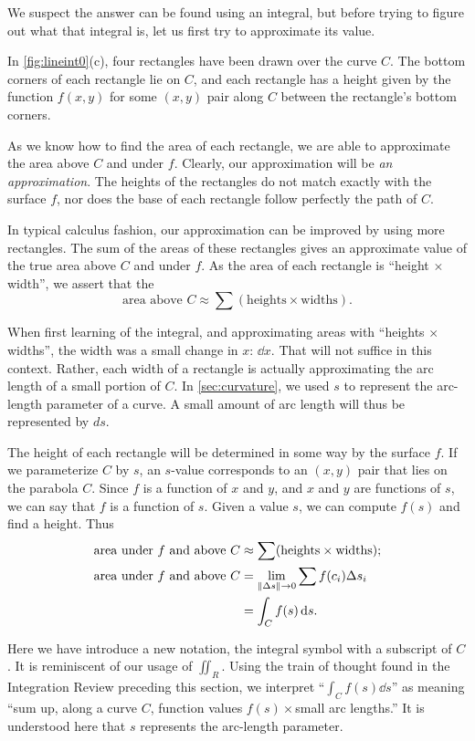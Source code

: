 We suspect the answer can be found using an integral, but before trying to figure out what that integral is, let us first try to approximate its value. 

In \autoref{fig:lineint0}(c), four rectangles have been drawn over the curve $C$. The bottom corners of each rectangle lie on $C$, and each rectangle has a height given by the function $f(x,y)$ for some $(x,y)$ pair along $C$ between the rectangle's bottom corners. 

As we know how to find the area of each rectangle, we are able to approximate the area above $C$ and under $f$. Clearly, our approximation will be \emph{an approximation}. The heights of the rectangles do not match exactly with the surface $f$, nor does the base of each rectangle follow perfectly the path of $C$.

In typical calculus fashion, our approximation can be improved by using more rectangles. The sum of the areas of these rectangles gives an approximate value of the true area above $C$ and under $f$. As the area of each rectangle is ``height $\times$ width'', we assert that the
\[\text{area above $C$}\approx \sum (\text{heights}\times\text{widths}).\]

When first learning of the integral, and approximating areas with ``heights $\times$ widths'', the width was a small change in $x$: $\dd x$. That will not suffice in this context. Rather, each width of a rectangle is actually approximating the arc length of a small portion of $C$. In \autoref{sec:curvature}, we used $s$ to represent the arc-length parameter of a curve. A small amount of arc length will thus be represented by $ds$. 

The height of each rectangle will be determined in some way by the surface $f$. If we parameterize $C$ by $s$, an $s$-value corresponds to an $(x,y)$ pair that lies on the parabola $C$. Since $f$ is a function of $x$ and $y$, and $x$ and $y$ are functions of $s$, we can say that $f$ is a function of $s$. Given a value $s$, we can compute $f(s)$ and find a height. Thus
\begin{align}
	\text{area under $f$ and above $C$}
	&\approx \sum (\text{heights}\times\text{widths});\notag\\
	\text{area under $f$ and above $C$}
	&=\lim_{\left\lVert \Delta s \right\rVert\to0}\sum f(c_i)\Delta s_i\notag\\
	&=\int_Cf(s)\operatorname{d}\! s.\label{eq:line0}
\end{align}

Here we have introduce a new notation, the integral symbol with a subscript of $C$. It is reminiscent of our usage of $\iint_R$. Using the train of thought found in the Integration Review preceding this section, we interpret ``$\int_C f(s)\dd s$'' as meaning ``sum up, along a curve $C$, function values $f(s)\times$small arc lengths.'' It is understood here that $s$ represents the arc-length parameter.

